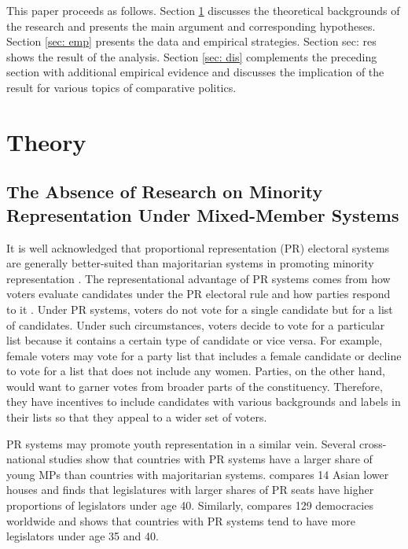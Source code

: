\documentclass[a4paper, 11pt]{article}
\begin{document}
This paper proceeds as follows. Section \ref{sec: the} discusses the theoretical backgrounds of the research and presents the main argument and corresponding hypotheses. Section \ref{sec: emp} presents the data and empirical strategies. Section {sec: res} shows the result of the analysis. Section \ref{sec: dis} complements the preceding section with additional empirical evidence and discusses the implication of the result for various topics of comparative politics. 

\section{Theory} \label{sec: the}

\subsection{The Absence of Research on Minority Representation Under Mixed-Member Systems}

It is well acknowledged that proportional representation (PR) electoral systems are generally better-suited than majoritarian systems in promoting minority representation \citep{matland_contagion_1996, matland_womens_1998, meserve_gender_2020}. The representational advantage of PR systems comes from how voters evaluate candidates under the PR electoral rule and how parties respond to it \citep{norris_electoral_2004}. Under PR systems, voters do not vote for a single candidate but for a list of candidates. Under such circumstances, voters decide to vote for a particular list because it contains a certain type of candidate or vice versa. For example, female voters may vote for a party list that includes a female candidate or decline to vote for a list that does not include any women. Parties, on the other hand, would want to garner votes from broader parts of the constituency. Therefore, they have incentives to include candidates with various backgrounds and labels in their lists so that they appeal to a wider set of voters. 

PR systems may promote youth representation in a similar vein. Several cross-national studies show that countries with PR systems have a larger share of young MPs than countries with majoritarian systems. \citet{joshi2013representation} compares 14 Asian lower houses and finds that legislatures with larger shares of PR seats have higher proportions of legislators under age 40. Similarly, \citet{stockemer_youth_2022} compares 129 democracies worldwide and shows that countries with PR systems tend to have more legislators under age 35 and 40. 
\end{document}
